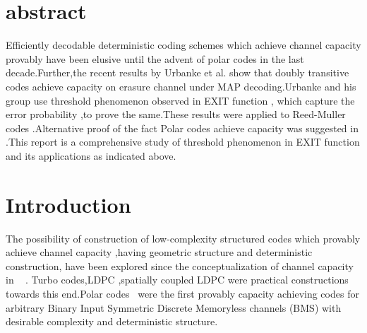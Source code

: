 \documentclass[
10pt, %
a4paper, %
oneside, %
headinclude,footinclude, %
BCOR5mm, %
]{scrartcl}
\begin{document}
\maketitle %


\setcounter{tocdepth}{2} %

\tableofcontents %

\section*{abstract}
Efficiently decodable deterministic coding schemes which achieve channel capacity provably have been elusive until the advent of polar codes\cite{arikan} in the last decade.Further,the recent results by Urbanke et al.\cite{rm1} show that doubly transitive codes achieve capacity on erasure channel under MAP decoding.Urbanke and his group use threshold phenomenon observed in EXIT function , which capture the error probability ,to prove the same.These results were applied to Reed-Muller codes \cite{rm1}.Alternative proof of the fact Polar codes achieve capacity was suggested in \cite{vishva}.This report is a comprehensive study of threshold phenomenon in EXIT function and its applications as indicated above.


\section{Introduction}
The possibility of construction of low-complexity structured codes which provably achieve channel capacity ,having geometric structure and deterministic construction, have been explored since the conceptualization of channel capacity in ~\cite{shannon} . Turbo codes,LDPC ,spatially coupled LDPC were practical constructions towards this end.Polar codes~\cite{arikan} were the first provably capacity achieving codes for arbitrary Binary Input Symmetric Discrete Memoryless channels (BMS) with desirable complexity and deterministic structure.
\end{document}
